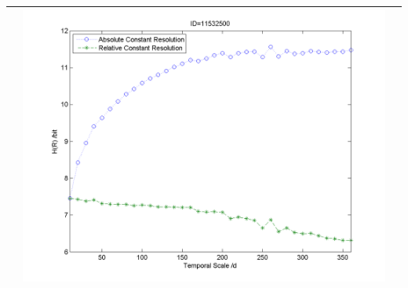 \documentclass[11pt]{article}
\begin{document}
\begin{table}[H]
{\begin{tabular}{ccc}
&\begin{minipage}{.6\textwidth}\includegraphics[width=\linewidth]{resultgraph/e11532500.png}\end{minipage}
\\
\bottomrule
\end{tabular}
}

\end{table}
\fi























\iffalse
\end{document}
